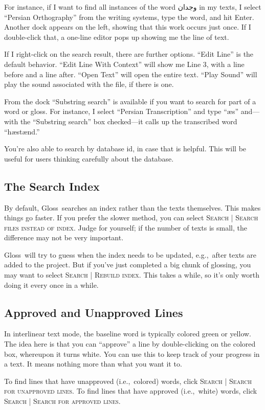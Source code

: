 \documentclass[oneside]{book}
\def\eg{e.g.,~}
\def\ie{i.e.,~}
\def\menu#1{\textsc{#1}}
\def\menu#1#2{\textsc{#1 | #2}}
\def\gloss{\textsf{Gloss}}
\def\p#1{\textfarsi{#1}}
\begin{document}
For instance, if I want to find all instances of the word \p{وجدان} in my texts, I select ``Persian Orthography'' from the writing systems, type the word, and hit Enter. Another dock appears on the left, showing that this work occurs just once. If I double-click that, a one-line editor pops up showing me the line of text.

If I right-click on the search result, there are further options. ``Edit Line'' is the default behavior. ``Edit Line With Context'' will show me Line 3, with a line before and a line after. ``Open Text'' will open the entire text. ``Play Sound'' will play the sound associated with the file, if there is one.

From the dock ``Substring search'' is available if you want to search for part of a word or gloss. For instance, I select ``Persian Transcription'' and type ``æs'' and---with the ``Substring search'' box checked---it calls up the transcribed word ``hæstænd.''

You're also able to search by database id, in case that is helpful. This will be useful for users thinking carefully about the database.

\subsection{The Search Index}
By default, \gloss\ searches an index rather than the texts themselves. This makes things go faster. If you prefer the slower method, you can select \menu{Search}{Search files instead of index}. Judge for yourself; if the number of texts is small, the difference may not be very important.

\gloss\ will try to guess when the index needs to be updated, \eg after texts are added to the project. But if you've just completed a big chunk of glossing, you may want to select \menu{Search}{Rebuild index}. This takes a while, so it's only worth doing it every once in a while.

\subsection{Approved and Unapproved Lines}
In interlinear text mode, the baseline word is typically colored green or yellow. The idea here is that you can ``approve'' a line by double-clicking on the colored box, whereupon it turns white. You can use this to keep track of your progress in a text. It means nothing more than what you want it to.

To find lines that have unapproved (\ie colored) words, click \menu{Search}{Search for unapproved lines}. To find lines that have approved (\ie white) words, click \menu{Search}{Search for approved lines}.
\end{document}
